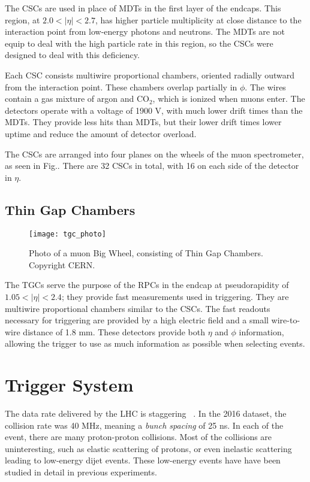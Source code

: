 The CSCs are used in place of MDTs in the first layer of the endcaps.
This region, at $2.0 < |\eta| < 2.7$, has higher particle multiplicity at close distance to the interaction point from low-energy photons and neutrons.
The MDTs are not equip to deal with the high particle rate in this region, so the CSCs were designed to deal with this deficiency.

Each CSC consists multiwire proportional chambers, oriented radially outward from the interaction point.
These chambers overlap partially in $\phi$.
The wires contain a gas mixture of argon and CO$_2$, which is ionized when muons enter.
The detectors operate with a voltage of 1900 V, with much lower drift times than the MDTs.
They provide less hits than MDTs, but their lower drift times lower uptime and reduce the amount of detector overload.

The CSCs are arranged into four planes on the wheels of the muon spectrometer, as seen in Fig..
There are 32 CSCs in total, with 16 on each side of the detector in $\eta.$

\subsection{Thin Gap Chambers}
\begin{figure}
\caption{Photo of a muon Big Wheel, consisting of Thin Gap Chambers. Copyright CERN.} \label{fig:tgc_photo}
\texttt{[image: tgc\_photo]}
\end{figure}

The TGCs serve the purpose of the RPCs in the endcap at pseudorapidity of $1.05 < |\eta| < 2.4 $; they provide fast measurements used in triggering.
They are multiwire proportional chambers similar to the CSCs.
The fast readouts necessary for triggering are provided by a high electric field and a small wire-to-wire distance of 1.8 mm.
These detectors provide both $\eta$ and $\phi$ information, allowing the trigger to use as much information as possible when selecting events.

\section{Trigger System}\label{sec:trigger}

The data rate delivered by the LHC is staggering ~\cite{ATL-DAQ-PUB-2016-001}.
In the 2016 dataset, the collision rate was 40 MHz, meaning a \textit{bunch spacing} of 25 ns.
In each of the event, there are many proton-proton collisions.
Most of the collisions are uninteresting, such as elastic scattering of protons, or even inelastic scattering leading to low-energy dijet events.
These low-energy events have have been studied in detail in previous experiments.

